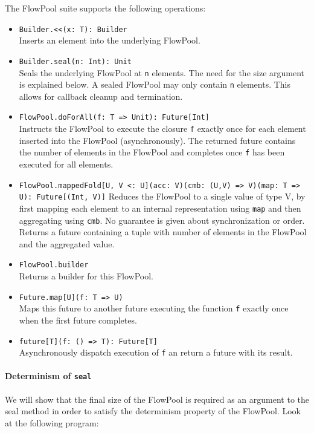 \documentclass[runningheads,a4paper]{llncs}
\begin{document}
The FlowPool suite supports the following operations:
\begin{itemize}
\item \texttt{Builder.<<(x: T): Builder}\\
  Inserts an element into the underlying FlowPool.
\item \texttt{Builder.seal(n: Int): Unit}\\
  Seals the underlying FlowPool at \texttt{n} elements. The need for
  the size argument is explained below. A sealed FlowPool may only
  contain \texttt{n} elements. This allows for callback cleanup and
  termination.
\item \texttt{FlowPool.doForAll(f: T => Unit): Future[Int]}\\
  Instructs
  the FlowPool to execute the closure \texttt{f} exactly once for each
  element inserted into the FlowPool (asynchronously). The returned
  future contains the number of elements in the FlowPool and completes
  once \texttt{f} has been executed for all elements.
\item \texttt{FlowPool.mappedFold[U, V <: U](acc: V)(cmb: (U,V) =>
    V)(map: T => U): Future[(Int, V)]}
  Reduces the FlowPool to a single value of type V, by first mapping
  each element to an internal representation using \texttt{map} and
  then aggregating using \texttt{cmb}. No guarantee is given about
  synchronization or order. Returns a future containing a tuple with
  number of elements in the FlowPool and the aggregated value.
\item \texttt{FlowPool.builder}\\
  Returns a builder for this FlowPool.
\item \texttt{Future.map[U](f: T => U)}\\
  Maps this future to another
  future executing the function \texttt{f} exactly once when the first
  future completes.
\item \texttt{future[T](f: () => T): Future[T]}\\
  Asynchronously dispatch execution of \texttt{f} an return a future
  with its result.
\end{itemize}

\paragraph{Determinism of \texttt{seal}} We will show that the final
size of the FlowPool is required as an argument to the seal method in
order to satisfy the determinism property of the FlowPool. Look at the
following program:
\end{document}
